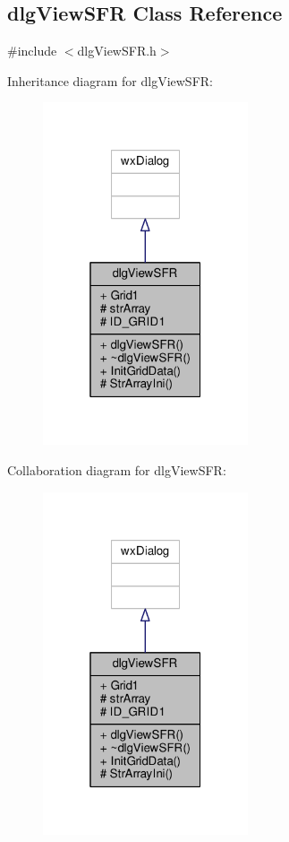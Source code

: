 \subsection{dlg\+View\+S\+FR Class Reference}
\label{classdlgViewSFR}


{\ttfamily \#include $<$dlg\+View\+S\+F\+R.\+h$>$}



Inheritance diagram for dlg\+View\+S\+FR\+:
\nopagebreak
\begin{figure}[H]
\begin{center}
\leavevmode
\includegraphics[width=172pt]{d3/dbb/classdlgViewSFR__inherit__graph}
\end{center}
\end{figure}


Collaboration diagram for dlg\+View\+S\+FR\+:
\nopagebreak
\begin{figure}[H]
\begin{center}
\leavevmode
\includegraphics[width=172pt]{dd/dd8/classdlgViewSFR__coll__graph}
\end{center}
\end{figure}
